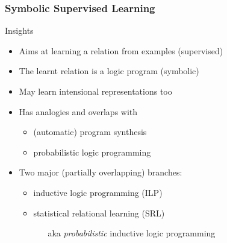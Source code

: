 \documentclass[presentation]{beamer}\mode<presentation>{\usetheme{AMSBolognaFC}}
\begin{document}
\begin{frame}[allowframebreaks]
\frametitle{Symbolic Supervised Learning}

    \begin{block}{Insights}
        \begin{itemize}
            \item Aims at learning a \alert{relation from examples} (supervised)
            \item The learnt relation is a \alert{logic program} (symbolic)
            \item May learn \alert{intensional} representations too
            \item Has analogies and overlaps with
            \begin{itemize}
                \item (automatic) program synthesis
                \item probabilistic logic programming
            \end{itemize}
            \item Two major (partially overlapping) branches:
            \begin{itemize}
                \item inductive logic programming (ILP)
                \item statistical relational learning (SRL)
                \begin{itemize}
                    \item[aka] \emph{probabilistic} inductive logic programming
                \end{itemize}
            \end{itemize}
        \end{itemize}
    \end{block}


\end{frame}
\end{document}
